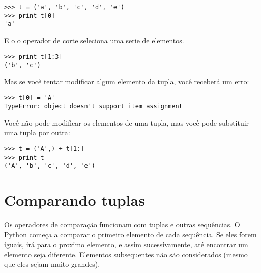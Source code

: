 
\beforeverb
\begin{verbatim}
>>> t = ('a', 'b', 'c', 'd', 'e')
>>> print t[0]
'a'
\end{verbatim}
\afterverb
%
E o o operador de corte seleciona uma serie de elementos.


\beforeverb
\begin{verbatim}
>>> print t[1:3]
('b', 'c')
\end{verbatim}
\afterverb
%
Mas se você tentar modificar algum elemento da tupla, você receberá
um erro:


\beforeverb
\begin{verbatim}
>>> t[0] = 'A'
TypeError: object doesn't support item assignment
\end{verbatim}
\afterverb
%
Você não pode modificar os elementos de uma tupla, mas você pode
substituir uma tupla por outra:

\beforeverb
\begin{verbatim}
>>> t = ('A',) + t[1:]
>>> print t
('A', 'b', 'c', 'd', 'e')
\end{verbatim}
\afterverb
%

\section{Comparando tuplas}


Os operadores de comparação funcionam com tuplas e outras sequências.
O Python começa a comparar o primeiro elemento de cada sequência.
Se eles forem iguais, irá para o proximo elemento, e assim sucessivamente,
até encontrar um elemento seja diferente. Elementos subsequentes
não são considerados (mesmo que eles sejam muito grandes).

